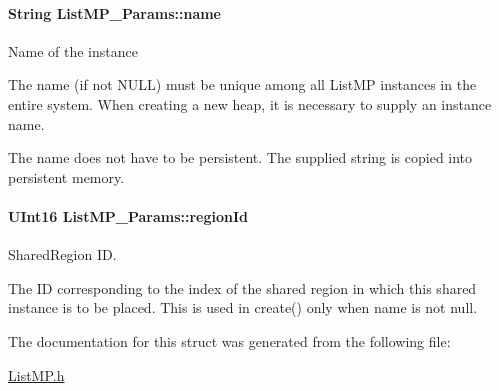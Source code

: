 \paragraph[{name}]{\setlength{\rightskip}{0pt plus 5cm}String List\-M\-P\-\_\-\-Params\-::name}\label{struct_list_m_p___params_a4ac70f37c8b5584fa115d6d7f412daba}
Name of the instance

The name (if not N\-U\-L\-L) must be unique among all List\-M\-P instances in the entire system. When creating a new heap, it is necessary to supply an instance name.

The name does not have to be persistent. The supplied string is copied into persistent memory. 
\paragraph[{region\-Id}]{\setlength{\rightskip}{0pt plus 5cm}U\-Int16 List\-M\-P\-\_\-\-Params\-::region\-Id}\label{struct_list_m_p___params_af812a3b0ea4698b841bfbf83eada903a}
Shared\-Region I\-D. \begin{DoxyVerb}   The ID corresponding to the index of the shared region in which this
   shared instance is to be placed.  This is used in create() only when
   name is not null.\end{DoxyVerb}
 

The documentation for this struct was generated from the following file\-:\begin{DoxyCompactItemize}
\item 
\hyperlink{_list_m_p_8h}{List\-M\-P.\-h}\end{DoxyCompactItemize}
